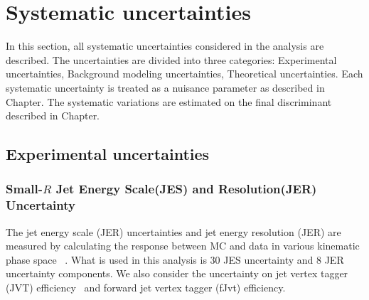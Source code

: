 \chapter{Systematic uncertainties}
In this section, all systematic uncertainties considered in the analysis are described. The uncertainties are divided into three categories:
Experimental uncertainties, Background modeling uncertainties, Theoretical uncertainties. Each systematic uncertainty is treated as a nuisance parameter as described in Chapter{}. The systematic variations are estimated on the final discriminant described in Chapter{}.

\section{Experimental uncertainties}

\subsection*{Small-$R$ Jet Energy Scale(JES) and Resolution(JER) Uncertainty}
The jet energy scale (JER) uncertainties and jet energy resolution (JER) are measured by calculating the response between MC and data in various kinematic phase space ~\cite{JetUncertainties}.
What is used in this analysis is 30 JES uncertainty and 8 JER uncertainty components.
We also consider the uncertainty on jet vertex tagger (JVT) efficiency~\cite{JVTCalib} and forward jet vertex tagger (fJvt) efficiency.

